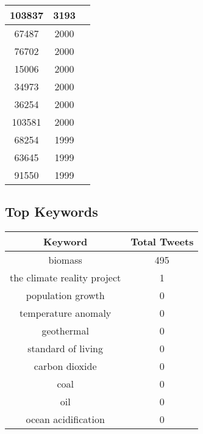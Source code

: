 \documentclass{article}\usepackage[T1]{fontenc}
\begin{document}
\begin{tabular}{|c|c|c|}
 \hline
103837 & 3193\\ 
 \hline
67487 & 2000\\ 
 \hline
76702 & 2000\\ 
 \hline
15006 & 2000\\ 
 \hline
34973 & 2000\\ 
 \hline
36254 & 2000\\ 
 \hline
103581 & 2000\\ 
 \hline
68254 & 1999\\ 
 \hline
63645 & 1999\\ 
 \hline
91550 & 1999\\ 
 \hline
\end{tabular}\subsection*{Top Keywords}\begin{tabular}{|c|c|}         \hline         Keyword & Total Tweets \\ 
 \hline
biomass & 495\\ 
 \hline
the climate reality project & 1\\ 
 \hline
population growth & 0\\ 
 \hline
temperature anomaly & 0\\ 
 \hline
geothermal & 0\\ 
 \hline
standard of living & 0\\ 
 \hline
carbon dioxide & 0\\ 
 \hline
coal & 0\\ 
 \hline
oil & 0\\ 
 \hline
ocean acidification & 0\\ 
 \hline
\end{tabular}
\end{document}
